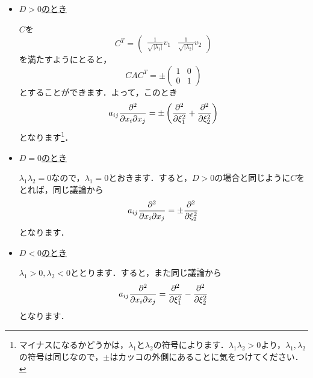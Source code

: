 \documentclass[a4paper,pdflatex,ja=standard]{bxjsarticle}
\begin{document}
\begin{enumerate}
  \begin{itemize}

    \item 
    
    \uline{$D>0$のとき}

    $C$を
    \begin{equation}
      C^T
      =
      \begin{pmatrix}
        \frac{1}{\sqrt{|\lambda_1|}}v_1
        &
        \frac{1}{\sqrt{|\lambda_2|}}v_2
      \end{pmatrix}
    \end{equation}
    を満たすようにとると，
    \begin{equation}
      CAC^T
      =
      \pm 
      \begin{pmatrix}
        1 & 0 \\
        0 & 1
      \end{pmatrix}
    \end{equation}
    とすることができます．よって，このとき
    \begin{equation}
      a_{ij}\pdv{}{x_i}{x_j}
      =
      \pm
      \left(  
        \pdv[2]{}{\xi_1}
        +
        \pdv[2]{}{\xi_2}
      \right)
    \end{equation}
    となります\footnote{
      マイナスになるかどうかは，$\lambda_1$と$\lambda_2$の符号によります．$\lambda_1\lambda_2>0$より，$\lambda_1,\lambda_2$の符号は同じなので，$\pm$はカッコの外側にあることに気をつけてください．
    }．


    \item 

    \uline{$D=0$のとき}

    $\lambda_1\lambda_2=0$なので，$\lambda_1=0$とおきます．すると，$D>0$の場合と同じように$C$をとれば，同じ議論から
    \begin{equation}
      a_{ij}\pdv{}{x_i}{x_j}
      =
      \pm
      \pdv[2]{}{\xi_2}
    \end{equation}
    となります．


    \item 

    \uline{$D<0$のとき}

    $\lambda_1>0, \lambda_2<0$ととります．すると，また同じ議論から
    \begin{equation}
      a_{ij}\pdv{}{x_i}{x_j}
      =
      \pdv[2]{}{\xi_1}
      -
      \pdv[2]{}{\xi_2}
    \end{equation}
    となります．


  \end{itemize}



\end{enumerate}
\end{document}
